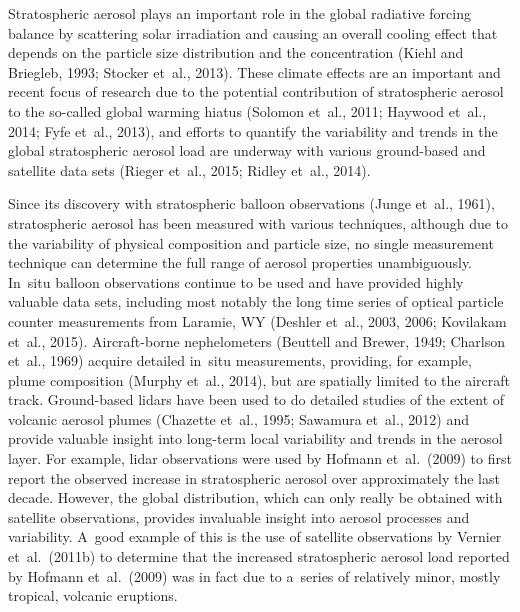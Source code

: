 \documentclass[amt]{copernicus}
\begin{document}
\introduction

Stratospheric aerosol plays an important role in the global radiative
forcing balance by scattering solar irradiation and causing an overall
cooling effect that depends on the particle size distribution and the
concentration (Kiehl and Briegleb, 1993; Stocker et~al., 2013). These
climate effects are an important and recent focus of research due to
the potential contribution of stratospheric aerosol to the so-called
global warming hiatus (Solomon et~al., 2011; Haywood et~al., 2014;
Fyfe et~al., 2013), and efforts to quantify the variability and trends
in the global stratospheric aerosol load are underway with various
ground-based and satellite data sets (Rieger et~al., 2015; Ridley
et~al., 2014).

Since its discovery with stratospheric balloon observations (Junge
et~al., 1961), stratospheric aerosol has been measured with various
techniques, although due to the variability of physical composition
and particle size, no single measurement technique can determine the
full range of aerosol properties unambiguously. In~situ balloon observations continue to be used and have
provided highly valuable data sets, including most notably the long
time series of optical particle counter measurements from Laramie, WY
(Deshler et~al., 2003, 2006; Kovilakam et~al., 2015). Aircraft-borne
nephelometers (Beuttell and Brewer, 1949; Charlson et~al., 1969)
acquire detailed in~situ measurements, providing, for example, plume
composition (Murphy et~al., 2014), but are spatially limited to the
aircraft track. Ground-based lidars have been used to do detailed
studies of the extent of volcanic aerosol plumes (Chazette et~al.,
1995; Sawamura et~al., 2012) and provide valuable insight into long-term local variability and trends in the aerosol layer. For example,
lidar observations were used by Hofmann et~al.~(2009) to first report
the observed increase in stratospheric aerosol over approximately the
last decade. However, the global distribution, which can only really
be obtained with satellite observations, provides invaluable insight
into aerosol processes and variability. A~good example of this is the
use of satellite observations by Vernier et~al.~(2011b) to determine
that the increased stratospheric aerosol load reported by Hofmann
et~al.~(2009) was in fact due to a~series of relatively minor, mostly
tropical, volcanic eruptions.
\end{document}

